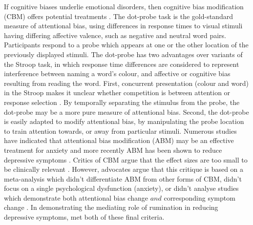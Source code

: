 \documentclass[man,floatsintext,a4paper,biblatex]{apa6}\usepackage[]{graphicx}\usepackage[]{color}
\begin{document}
If cognitive biases underlie emotional disorders,
then cognitive bias modification (CBM) offers potential
treatments \parencite{hertel_cognitive_2011}. The dot-probe task
\parencite{macleod_attentional_1986} is the gold-standard measure of
attentional bias, using differences in response times to visual stimuli
having differing affective valence, such as negative and neutral word
pairs. Participants respond to a probe which appears at one or the
other location of the previously displayed stimuli.  The dot-probe has
two advantages over variants of the Stroop task, in which response time
differences are considered to represent interference between naming a
word's colour, and affective or cognitive bias resulting from reading the
word. First, concurrent presentation (colour and word) in the Stroop makes
it unclear whether competition is between attention or response selection
\parencite{macleod_half_1991}. By temporally separating the stimulus
from the probe, the dot-probe may be a more pure measure of attentional
bias. Second, the dot-probe is easily adapted to modify attentional bias,
by manipulating the probe location to train attention towards, or away
from particular stimuli. Numerous studies have indicated that attentional
bias modification (ABM) may be an effective treatment for anxiety
\parencite{hakamata_attention_2010} and more recently ABM has been shown
to reduce depressive symptoms \parencite{yang_attention_2015}. Critics
of CBM argue that the effect sizes are too small to be clinically
relevant \parencite{cristea_efficacy_2015}. However, advocates
argue that this critique is based on a meta-analysis which didn't
differentiate ABM from other forms of CBM, didn't focus on a single
psychological dysfunction (anxiety), or didn't analyse studies
which demonstrate both attentional bias change ${and}$ corresponding
symptom change \parencite{macleod_attentional_2015}. In demonstrating
the mediating role of rumination in reducing depressive symptoms,
\textcite{yang_attention_2015} met both of these final criteria.
\end{document}
